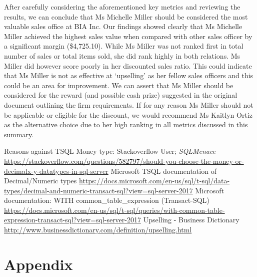 \documentclass{article}
\begin{document}
    \noindent After carefully considering the aforementioned key metrics and reviewing the
    results, we can conclude that Ms Michelle Miller should be considered the most valuable
    sales office at BIA Inc. Our findings showed clearly that Ms Michelle Miller achieved
    the highest sales value when compared with other sales officer by a significant margin 
    (\$4,725.10). While Ms Miller was not ranked first in total number of sales or total items
    sold, she did rank highly in both relations. Ms Miller did however score poorly in her
    discounted sales ratio. This could indicate that Ms Miller is not as effective at
    `upselling' as her fellow sales officers and this could be an area for improvement.
    We can assert that Ms Miller should be considered for the reward (and possible cash
    prize) suggested in the original document outlining the firm requirements. If for any
    reason Ms Miller should not be applicable or eligible for the discount, we would recommend
    Ms Kaitlyn Ortiz as the alternative choice due to her high ranking in all metrics discussed
    in this summary.
     

    \newpage
    \begin{thebibliography}{9}
        \raggedright
            Reasons against TSQL Money type: Stackoverflow User; \textit{SQLMenace}
            \url{https://stackoverflow.com/questions/582797/should-you-choose-the-money-or-decimalx-y-datatypes-in-sql-server}
            Microsoft TSQL documentation of Decimal/Numeric types
            \url{https://docs.microsoft.com/en-us/sql/t-sql/data-types/decimal-and-numeric-transact-sql?view=sql-server-2017}
        Microsoft documentation: WITH common\_table\_expression (Transact-SQL)
            \url{https://docs.microsoft.com/en-us/sql/t-sql/queries/with-common-table-expression-transact-sql?view=sql-server-2017}
        		Upselling - Business Dictionary
        		\url{http://www.businessdictionary.com/definition/upselling.html}
    \end{thebibliography}

    \newpage
    \section{Appendix}
    \label{sec:Appendix}
\end{document}
